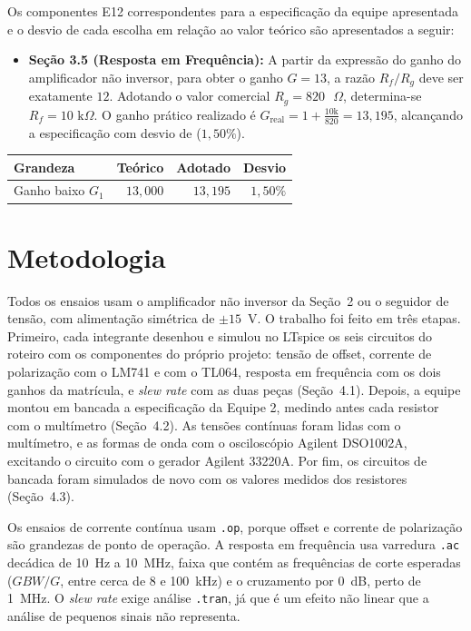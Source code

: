 \documentclass[11pt,a4paper]{article}
\begin{document}
Os componentes E12 correspondentes para a especificação da equipe apresentada e o desvio de cada escolha em relação ao valor teórico são apresentados a seguir:

\begin{itemize}

    \item \textbf{Seção 3.5 (Resposta em Frequência):} A partir da expressão do ganho do amplificador não inversor, para obter o ganho $G = 13$, a razão $R_f/R_g$ deve ser exatamente $12$. Adotando o valor comercial $R_g = 820\text{ }\Omega$, determina-se $R_f = 10\text{ k}\Omega$. O ganho prático realizado é $G_{\text{real}} = 1 + \frac{10\text{k}}{820\text{}} = 13{,}195$, alcançando a especificação com desvio de ($1{,}50\%$).

\end{itemize}

\begin{center}
\renewcommand{\arraystretch}{1.2}
\begin{tabular}{@{}lrrr@{}}
\toprule
\textbf{Grandeza} & \textbf{Teórico} & \textbf{Adotado} & \textbf{Desvio} \\
\midrule
Ganho baixo $G_1$ & $13{,}000$ & $13{,}195$ & $1{,}50\%$ \\
\bottomrule
\end{tabular}
\end{center}

\section{Metodologia}

Todos os ensaios usam o amplificador não inversor da Seção~2 ou o seguidor de tensão, com
alimentação simétrica de $\pm15$~V. O trabalho foi feito em três etapas. Primeiro, cada integrante
desenhou e simulou no LTspice os seis circuitos do roteiro com os componentes do próprio projeto:
tensão de offset, corrente de polarização com o LM741 e com o TL064, resposta em frequência com os
dois ganhos da matrícula, e \textit{slew rate} com as duas peças (Seção~4.1). Depois, a equipe
montou em bancada a especificação da Equipe 2, medindo antes cada resistor com o multímetro
(Seção~4.2). As tensões contínuas foram lidas com o multímetro, e as formas de onda com o
osciloscópio Agilent DSO1002A, excitando o circuito com o gerador Agilent 33220A. Por fim, os
circuitos de bancada foram simulados de novo com os valores medidos dos resistores (Seção~4.3).

Os ensaios de corrente contínua usam \texttt{.op}, porque offset e corrente de polarização são
grandezas de ponto de operação. A resposta em frequência usa varredura \texttt{.ac} decádica de
10~Hz a 10~MHz, faixa que contém as frequências de corte esperadas ($GBW/G$, entre cerca de 8 e
100~kHz) e o cruzamento por $0$~dB, perto de 1~MHz. O \textit{slew rate} exige análise
\texttt{.tran}, já que é um efeito não linear que a análise de pequenos sinais não representa.
\end{document}
